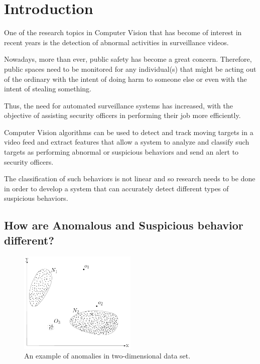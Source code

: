 \chapter{Introduction}\label{ch:introduction}

One of the research topics in Computer Vision that has become of interest in recent years is the detection of abnormal activities in surveillance videos. 

Nowadays, more than ever, public safety has become a great concern. Therefore, public spaces need to be monitored for any individual(s) that might be acting out of the ordinary with the intent of doing harm to someone else or even with the intent of stealing something.

Thus, the need for automated surveillance systems has increased, with the objective of assisting security officers in performing their job more efficiently.

Computer Vision algorithms can be used to detect and track moving targets in a video feed and extract features that allow a system to analyze and classify such targets as performing abnormal or suspicious behaviors and send an alert to security officers.

The classification of such behaviors is not linear and so research needs to be done in order to develop a system that can accurately detect different types of suspicious behaviors.

\section{How are Anomalous and Suspicious behavior different?}

\begin{figure}
  \centering
  \includegraphics[width=0.5\textwidth]{figures/Anomalies_in_2D_data.png}
  \caption{An example of anomalies in two-dimensional data set\cite{n23}.}
  \label{fig:AnomaliesExample1}
\end{figure}

